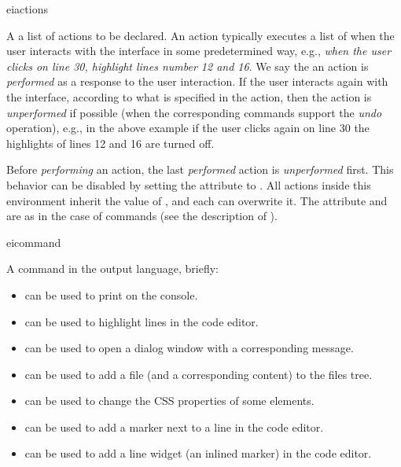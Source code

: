 \bigskip
\xmlstruct
{eiactions}
{
%
  A a list of actions to be declared. An action typically executes a
  list of  when the user interacts with the
  interface in some predetermined way, e.g., \emph{when the user
    clicks on line 30, highlight lines number 12 and 16}. We say the
  an action is \emph{performed} as a response to the user interaction.
%
  If the user interacts again with the interface, according to what is
  specified in the action, then the action is \emph{unperformed} if
  possible (when the corresponding commands support the \emph{undo}
  operation), e.g., in the above example if the user clicks again on
  line 30 the highlights of lines 12 and 16 are turned off.

  Before \emph{performing} an action, the last \emph{performed} action
  is \emph{unperformed} first. This behavior can be disabled by
  setting the  attribute to
  . All actions inside this environment inherit the
  value of , and each can overwrite it.
% 
  The attribute  and  are
  as in the case of commands (see the description of
  ).
%
}
{}


\bigskip
\xmlstruct
{eicommand}
{
A command in the \ei output language, briefly:
\begin{itemize}
\item {} can be used to print on the console.
%
\item {} can be used to highlight
  lines in the code editor.
%
\item {} can be used to open a dialog
  window with a corresponding message.
%
\item {} can be used to add a file (and a
  corresponding content) to the files tree.
%
\item {} can be used to change the CSS
  properties of some elements.
%
\item {} can be used to add a marker next
  to a line in the code editor.
%
\item {} can be used to add a line
  widget (an inlined marker) in the code editor.
%
\end{itemize}
}
{}


